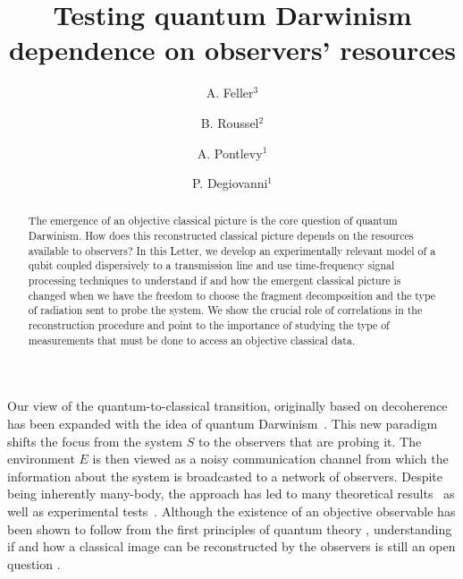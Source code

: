 \title{Testing quantum Darwinism dependence on observers' resources}

\author{A. Feller$^3$}
\author{B. Roussel$^2$}
\author{A. Pontlevy$^1$}
\author{P. Degiovanni$^1$}


\begin{abstract}
The emergence of an objective classical picture
is the core question of quantum Darwinism. How does
this reconstructed classical picture depends on the resources
available to observers?
%
In this Letter, we develop an experimentally relevant model of a qubit 
coupled dispersively to a transmission line and use time-frequency
signal processing techniques to understand if and how the emergent classical
picture is changed when we have the freedom to choose the
fragment decomposition and the type of radiation sent to probe
the system. We show the crucial role of correlations in the reconstruction 
procedure and point to the importance of studying the type of 
measurements that must be done to access an objective classical data.

\end{abstract}


\maketitle

%
Our view of the quantum-to-classical transition, originally based on
decoherence~\cite{Zurek-2003-1} has been expanded with the idea of quantum
Darwinism~\cite{Zurek-2009-1}. This new paradigm shifts the focus from 
the system $S$ to the observers that are probing it. The environment 
$E$ is then viewed as a noisy communication channel from which 
the information about the system is broadcasted to a network of 
observers. Despite being inherently many-body, the approach has led 
to many theoretical results~\cite{Zurek-2001,Riedel-2010,Riedel-2011-1,
Riedel-2012,Zurek-2013,Brandao-2015,Knott-2018-1,Zwolak-2014}
as well as experimental tests~\cite{Burke-2010-1,Zurek-2019}. Although
the existence of an objective observable has been shown to follow from
the first principles of quantum theory \cite{Brandao-2015,Knott-2018-1},
understanding if and how a classical image can be reconstructed by the
observers is still an open question
\cite{Ollivier-2022-1,Garcia-Pinto-2021-1}.

